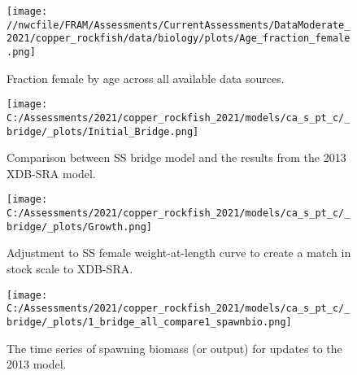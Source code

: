 \documentclass[11pt,
  english,
  a4paper,
]{article}
\begin{document}

\begin{figure}
\centering
\texttt{[image: //nwcfile/FRAM/Assessments/CurrentAssessments/DataModerate\_2021/copper\_rockfish/data/biology/plots/Age\_fraction\_female.png]}
\caption{Fraction female by age across all available data sources.\label{fig:age-sex-ratio}}
\end{figure}

\tagmcend\tagstructend


\begin{figure}
\centering
\texttt{[image: C:/Assessments/2021/copper\_rockfish\_2021/models/ca\_s\_pt\_c/\_bridge/\_plots/Initial\_Bridge.png]}
\caption{Comparison between SS bridge model and the results from the 2013 XDB-SRA model.\label{fig:bridge-1}}
\end{figure}

\tagmcend\tagstructend


\begin{figure}
\centering
\texttt{[image: C:/Assessments/2021/copper\_rockfish\_2021/models/ca\_s\_pt\_c/\_bridge/\_plots/Growth.png]}
\caption{Adjustment to SS female weight-at-length curve to create a match in stock scale to XDB-SRA.\label{fig:bridge-growth}}
\end{figure}

\tagmcend\tagstructend


\begin{figure}
\centering
\texttt{[image: C:/Assessments/2021/copper\_rockfish\_2021/models/ca\_s\_pt\_c/\_bridge/\_plots/1\_bridge\_all\_compare1\_spawnbio.png]}
\caption{The time series of spawning biomass (or output) for updates to the 2013 model.\label{fig:bridge-ssb}}
\end{figure}
\end{document}

